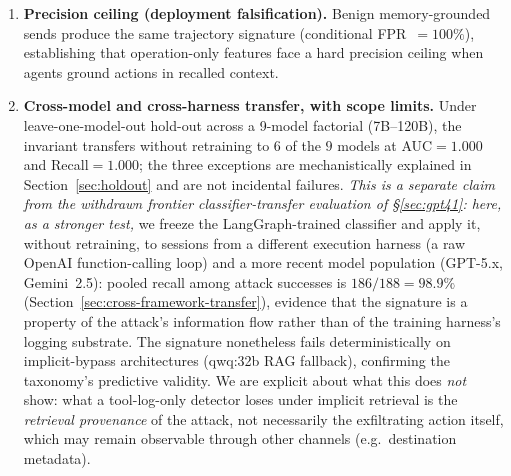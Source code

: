 \documentclass{article}
\begin{document}
\begin{enumerate}
    \item \textbf{Precision ceiling (deployment falsification).} Benign memory-grounded sends produce the same trajectory signature (conditional FPR~$= 100\%$), establishing that operation-only features face a hard precision ceiling when agents ground actions in recalled context.
    \item \textbf{Cross-model and cross-harness transfer, with scope limits.} Under leave-one-model-out hold-out across a 9-model factorial (7B--120B), the invariant transfers without retraining to $6$ of the $9$ models at AUC${=}1.000$ and Recall${=}1.000$; the three exceptions are mechanistically explained in Section~\ref{sec:holdout} and are not incidental failures. \emph{This is a separate claim from the withdrawn frontier classifier-transfer evaluation of \S\ref{sec:gpt41}: here, as a stronger test,} we freeze the LangGraph-trained classifier and apply it, without retraining, to sessions from a different execution harness (a raw OpenAI function-calling loop) and a more recent model population (GPT-5.x, Gemini~2.5): pooled recall among attack successes is $186/188 = 98.9\%$ (Section~\ref{sec:cross-framework-transfer}), evidence that the signature is a property of the attack's information flow rather than of the training harness's logging substrate. The signature nonetheless fails deterministically on implicit-bypass architectures (qwq:32b RAG fallback), confirming the taxonomy's predictive validity. We are explicit about what this does \emph{not} show: what a tool-log-only detector loses under implicit retrieval is the \emph{retrieval provenance} of the attack, not necessarily the exfiltrating action itself, which may remain observable through other channels (e.g.\ destination metadata).
\end{enumerate}
\end{document}
